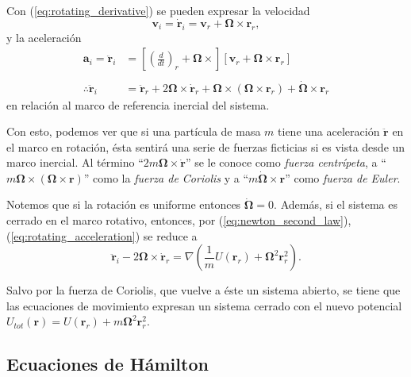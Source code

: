 Con (\ref{eq:rotating_derivative}) se pueden expresar la velocidad 
\begin{equation}
 \mathbf{v}_i = \dot{\mathbf{r}}_i = \mathbf{v}_r + \mathbf{\Omega} \times \mathbf{r}_r,
 \label{eq:rotating_velocity}
\end{equation}
y la aceleración
\begin{align}
 \mathbf{a}_i = \ddot{\mathbf{r}}_i &= \left[ \left( \frac{d}{dt}\right)_r + \mathbf{\Omega} \times \right]\left[ \mathbf{v}_r + \mathbf{\Omega} \times \mathbf{r}_r \right] \nonumber \\
 \nonumber \\
 \therefore \ddot{\mathbf{r}}_i &= \ddot{\mathbf{r}}_r + 2\mathbf{\Omega} \times \mathbf{\dot{r}}_r + \mathbf{\Omega} \times \left( \mathbf{\Omega} \times \mathbf{r}_r \right) + \dot{\mathbf{\Omega}} \times \mathbf{r}_r
 \label{eq:rotating_acceleration}
\end{align}
en relación al marco de referencia inercial del sistema. 

Con esto, podemos ver que si una partícula de masa $m$ tiene una aceleración $\ddot{\mathbf{r}}$ en el marco en rotación, ésta sentirá una serie de fuerzas ficticias si es vista desde un marco inercial. Al término ``$2 m \mathbf{\Omega} \times \dot{\mathbf{r}}$'' se le conoce como \textit{fuerza centrípeta}, a ``$m \mathbf{\Omega} \times ( \mathbf{\Omega} \times \mathbf{r} )$'' como la \textit{fuerza de Coriolis} y a ``$m \dot{\mathbf{\Omega}} \times \mathbf{r}$'' como \textit{fuerza de Euler}.

Notemos que si la rotación es uniforme entonces $\dot{\mathbf{\Omega}} = 0$. Además, si el sistema es cerrado en el marco rotativo, entonces, por (\ref{eq:newton_second_law}), (\ref{eq:rotating_acceleration}) se reduce a 
\begin{equation}
 \ddot{\mathbf{r}}_i - 2\mathbf{\Omega} \times \dot{\mathbf{r}}_r = \nabla \left( \frac{1}{m}U(\mathbf{r}_r) +  \mathbf{\Omega}^2 \mathbf{r}_r^2 \right).
\end{equation}

Salvo por la fuerza de Coriolis, que vuelve a éste un sistema abierto, se tiene que las ecuaciones de movimiento expresan un sistema cerrado con el nuevo potencial $U_{tot}(\mathbf{r}) = U(\mathbf{r}_r) + m \mathbf{\Omega}^2 \mathbf{r}_r^2$.


\subsection{Ecuaciones de Hámilton}
\label{sec:hamilton}

